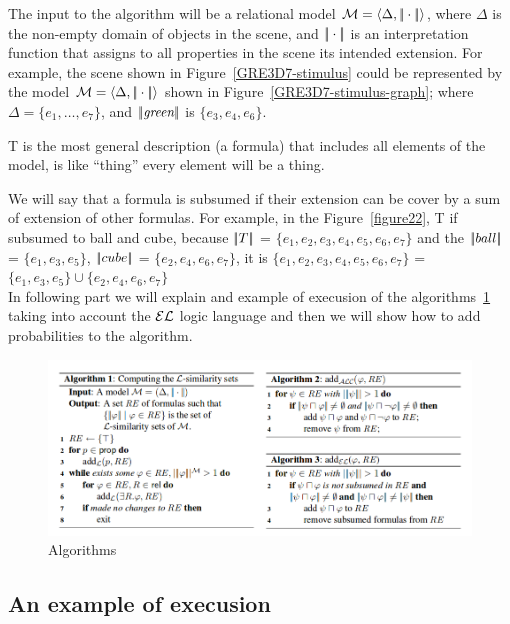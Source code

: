 The input to the algorithm will be a relational model $\mathcal{M} = \langle \Delta, |\!|\cdot|\!| \rangle$,
where $\Delta$ is the non-empty domain of objects in the scene, and $|\!|\cdot|\!|$ is an 
interpretation function that assigns to all properties in the scene its intended extension.  For example, 
the scene shown in Figure~\ref{GRE3D7-stimulus} could be represented by the model $\mathcal{M}=\langle \Delta,|\!|\cdot|\!| \rangle$ shown in Figure~\ref{GRE3D7-stimulus-graph}; where $\Delta = \{e_1,\ldots,e_7\}$, and $|\!|\emph{green}|\!|$ is $\{e_3,e_4,e_6\}$.

T is the most general description (a formula) that includes all elements of the model, is like ``thing'' every element will be a thing.

We will say that a formula is subsumed if their extension can be cover by a sum of extension of other formulas. For example, in the Figure~\ref{figure22}, T if subsumed to ball and cube, because $|\!|T|\!|$ = $\{e_1, e_2, e_3, e_4, e_5, e_6, e_7\}$ and the $|\!|ball|\!|$ = $\{e_1, e_3, e_5\}$, $|\!|cube|\!|$ = $\{e_2, e_4, e_6, e_7\}$, it is $\{e_1, e_2, e_3, e_4, e_5, e_6, e_7\}$ = $\{e_1, e_3, e_5\} \cup \{e_2, e_4, e_6, e_7\}$ \\

In following part we will explain and example of execusion of the algorithms~\ref{algoritmoOriginal} taking into account the $\mathcal{EL}$ logic language and then we will show how to add probabilities to the algorithm.

\begin{figure}[h!]
\begin{center}
\includegraphics[width=\textwidth]{images/algoritmoOriginal.png}
\end{center}
\vspace*{-2em}
\caption{Algorithms \label{algoritmoOriginal}}
\end{figure}

\subsection{An example of execusion}

